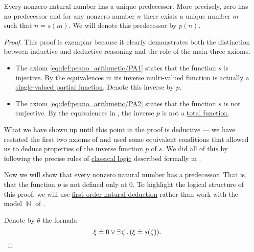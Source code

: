 \begin{proposition}\label{thm:nonzero_natural_numbers_have_predecessors}
  Every nonzero natural number has a unique predecessor. More precisely, zero has no predecessor and for any nonzero number \( n \) there exists a unique number \( m \) such that \( n = s(m) \). We will denote this predecessor by \( p(n) \).
\end{proposition}
\begin{proof}
  This proof is exemplar because it clearly demonstrates both the distinction between inductive and deductive reasoning and the role of the main three axioms.

  \begin{itemize}
    \item The axiom \eqref{eq:def:peano_arithmetic/PA1} states that the function \( s \) is injective. By the equivalences in  its \hyperref[def:multi_valued_function/inverse]{inverse multi-valued function} is actually a \hyperref[def:partial_function]{single-valued partial function}. Denote this inverse by \( p \).

    \item The axiom \eqref{eq:def:peano_arithmetic/PA2} states that the function \( s \) is not surjective. By the equivalences in , the inverse \( p \) is not a \hyperref[def:multi_valued_function/total]{total function}.
  \end{itemize}

  What we have shown up until this point in the proof is deductive --- we have restated the first two axioms of  and used some equivalent conditions that allowed us to deduce properties of the inverse function \( p \) of \( s \). We did all of this by following the precise rules of \hyperref[def:classical_logic]{classical logic} described formally in .

  Now we will show that every nonzero natural number has a predecessor. That is, that the function \( p \) is not defined only at \( 0 \). To highlight the logical structure of this proof, we will use \hyperref[def:first_order_derivation_system]{first-order natural deduction} rather than work with the model \( \BbbN \) of .

  Denote by \( \theta \) the formula
  \begin{equation*}
    \xi \doteq 0 \vee \exists \thinspace \zeta \thinspace . \thinspace (\xi \doteq s(\zeta)).
  \end{equation*}


\end{proof}

